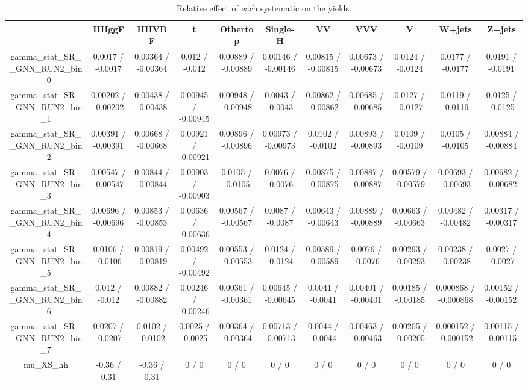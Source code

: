 \documentclass[10pt]{article}
\begin{document}
\begin{table}[htbp]
\begin{center}
\begin{tabular}{|c|c|c|c|c|c|c|c|c|c|c|}
\hline 
      & HHggF      & HHVBF      & t      & Othertop      & Single-H      & VV      & VVV      & V      & W+jets      & Z+jets \\ 
\hline 
  gamma_stat_SR__GNN_RUN2_bin_0 & 0.0017 / -0.0017 & 0.00364 / -0.00364 & 0.012 / -0.012 & 0.00889 / -0.00889 & 0.00146 / -0.00146 & 0.00815 / -0.00815 & 0.00673 / -0.00673 & 0.0124 / -0.0124 & 0.0177 / -0.0177 & 0.0191 / -0.0191 \\ 
  gamma_stat_SR__GNN_RUN2_bin_1 & 0.00202 / -0.00202 & 0.00438 / -0.00438 & 0.00945 / -0.00945 & 0.00948 / -0.00948 & 0.0043 / -0.0043 & 0.00862 / -0.00862 & 0.00685 / -0.00685 & 0.0127 / -0.0127 & 0.0119 / -0.0119 & 0.0125 / -0.0125 \\ 
  gamma_stat_SR__GNN_RUN2_bin_2 & 0.00391 / -0.00391 & 0.00668 / -0.00668 & 0.00921 / -0.00921 & 0.00896 / -0.00896 & 0.00973 / -0.00973 & 0.0102 / -0.0102 & 0.00893 / -0.00893 & 0.0109 / -0.0109 & 0.0105 / -0.0105 & 0.00884 / -0.00884 \\ 
  gamma_stat_SR__GNN_RUN2_bin_3 & 0.00547 / -0.00547 & 0.00844 / -0.00844 & 0.00903 / -0.00903 & 0.0105 / -0.0105 & 0.0076 / -0.0076 & 0.00875 / -0.00875 & 0.00887 / -0.00887 & 0.00579 / -0.00579 & 0.00693 / -0.00693 & 0.00682 / -0.00682 \\ 
  gamma_stat_SR__GNN_RUN2_bin_4 & 0.00696 / -0.00696 & 0.00853 / -0.00853 & 0.00636 / -0.00636 & 0.00567 / -0.00567 & 0.0087 / -0.0087 & 0.00643 / -0.00643 & 0.00889 / -0.00889 & 0.00663 / -0.00663 & 0.00482 / -0.00482 & 0.00317 / -0.00317 \\ 
  gamma_stat_SR__GNN_RUN2_bin_5 & 0.0106 / -0.0106 & 0.00819 / -0.00819 & 0.00492 / -0.00492 & 0.00553 / -0.00553 & 0.0124 / -0.0124 & 0.00589 / -0.00589 & 0.0076 / -0.0076 & 0.00293 / -0.00293 & 0.00238 / -0.00238 & 0.0027 / -0.0027 \\ 
  gamma_stat_SR__GNN_RUN2_bin_6 & 0.012 / -0.012 & 0.00882 / -0.00882 & 0.00246 / -0.00246 & 0.00361 / -0.00361 & 0.00645 / -0.00645 & 0.0041 / -0.0041 & 0.00401 / -0.00401 & 0.00185 / -0.00185 & 0.000868 / -0.000868 & 0.00152 / -0.00152 \\ 
  gamma_stat_SR__GNN_RUN2_bin_7 & 0.0207 / -0.0207 & 0.0102 / -0.0102 & 0.0025 / -0.0025 & 0.00364 / -0.00364 & 0.00713 / -0.00713 & 0.0044 / -0.0044 & 0.00463 / -0.00463 & 0.00205 / -0.00205 & 0.000152 / -0.000152 & 0.00115 / -0.00115 \\ 
  mu_XS_hh & -0.36 / 0.31 & -0.36 / 0.31 & 0 / 0 & 0 / 0 & 0 / 0 & 0 / 0 & 0 / 0 & 0 / 0 & 0 / 0 & 0 / 0 \\ 
\hline 
\end{tabular} 
\caption{Relative effect of each systematic on the yields.} 
\end{center} 
\end{table} 
\end{document}
